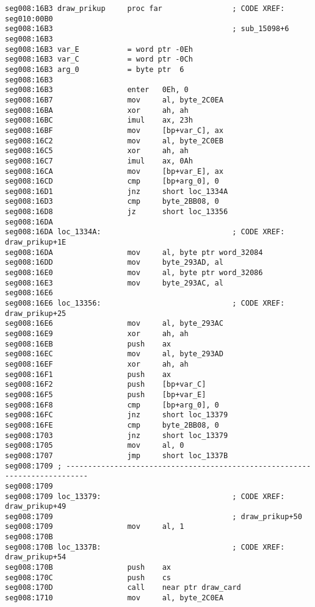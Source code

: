 \begin{lstlisting}[style=customasmx86]
seg008:16B3 draw_prikup     proc far                ; CODE XREF: seg010:00B0
seg008:16B3                                         ; sub_15098+6
seg008:16B3
seg008:16B3 var_E           = word ptr -0Eh
seg008:16B3 var_C           = word ptr -0Ch
seg008:16B3 arg_0           = byte ptr  6
seg008:16B3
seg008:16B3                 enter   0Eh, 0
seg008:16B7                 mov     al, byte_2C0EA
seg008:16BA                 xor     ah, ah
seg008:16BC                 imul    ax, 23h
seg008:16BF                 mov     [bp+var_C], ax
seg008:16C2                 mov     al, byte_2C0EB
seg008:16C5                 xor     ah, ah
seg008:16C7                 imul    ax, 0Ah
seg008:16CA                 mov     [bp+var_E], ax
seg008:16CD                 cmp     [bp+arg_0], 0
seg008:16D1                 jnz     short loc_1334A
seg008:16D3                 cmp     byte_2BB08, 0
seg008:16D8                 jz      short loc_13356
seg008:16DA
seg008:16DA loc_1334A:                              ; CODE XREF: draw_prikup+1E
seg008:16DA                 mov     al, byte ptr word_32084
seg008:16DD                 mov     byte_293AD, al
seg008:16E0                 mov     al, byte ptr word_32086
seg008:16E3                 mov     byte_293AC, al
seg008:16E6
seg008:16E6 loc_13356:                              ; CODE XREF: draw_prikup+25
seg008:16E6                 mov     al, byte_293AC
seg008:16E9                 xor     ah, ah
seg008:16EB                 push    ax
seg008:16EC                 mov     al, byte_293AD
seg008:16EF                 xor     ah, ah
seg008:16F1                 push    ax
seg008:16F2                 push    [bp+var_C]
seg008:16F5                 push    [bp+var_E]
seg008:16F8                 cmp     [bp+arg_0], 0
seg008:16FC                 jnz     short loc_13379
seg008:16FE                 cmp     byte_2BB08, 0
seg008:1703                 jnz     short loc_13379
seg008:1705                 mov     al, 0
seg008:1707                 jmp     short loc_1337B
seg008:1709 ; ---------------------------------------------------------------------------
seg008:1709
seg008:1709 loc_13379:                              ; CODE XREF: draw_prikup+49
seg008:1709                                         ; draw_prikup+50
seg008:1709                 mov     al, 1
seg008:170B
seg008:170B loc_1337B:                              ; CODE XREF: draw_prikup+54
seg008:170B                 push    ax
seg008:170C                 push    cs
seg008:170D                 call    near ptr draw_card
seg008:1710                 mov     al, byte_2C0EA

\end{lstlisting}
